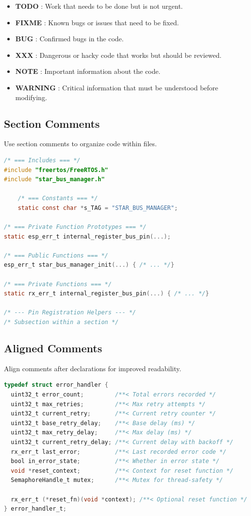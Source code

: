 \begin{itemize}
\item \textbf{TODO} : Work that needs to be done but is not urgent.
    \item \textbf{FIXME} : Known bugs or
    issues that need to be fixed.
    \item \textbf{BUG} : Confirmed bugs in the code.
    \item \textbf{XXX} : Dangerous or
    hacky code that works but should be
        reviewed.
    \item \textbf{NOTE} : Important information about the
                               code.
    \item \textbf{WARNING}
    : Critical information that must be understood before modifying.
\end{itemize}

\subsection{Section Comments}

Use section comments to organize code within files.

\begin{lstlisting}[language = C]
    /* === Includes === */
#include "freertos/FreeRTOS.h"
#include "star_bus_manager.h"

    /* === Constants === */
    static const char *s_TAG = "STAR_BUS_MANAGER";

/* === Private Function Prototypes === */
static esp_err_t internal_register_bus_pin(...);

/* === Public Functions === */
esp_err_t star_bus_manager_init(...) { /* ... */}

/* === Private Functions === */
static rx_err_t internal_register_bus_pin(...) { /* ... */}

/* --- Pin Registration Helpers --- */
/* Subsection within a section */
\end{lstlisting}

\subsection{Aligned Comments}

Align comments after declarations for improved readability.

\begin{lstlisting}[language=C]
typedef struct error_handler {
  uint32_t error_count;         /**< Total errors recorded */
  uint32_t max_retries;         /**< Max retry attempts */
  uint32_t current_retry;       /**< Current retry counter */
  uint32_t base_retry_delay;    /**< Base delay (ms) */
  uint32_t max_retry_delay;     /**< Max delay (ms) */
  uint32_t current_retry_delay; /**< Current delay with backoff */
  rx_err_t last_error;          /**< Last recorded error code */
  bool in_error_state;          /**< Whether in error state */
  void *reset_context;          /**< Context for reset function */
  SemaphoreHandle_t mutex;      /**< Mutex for thread-safety */

  rx_err_t (*reset_fn)(void *context); /**< Optional reset function */
} error_handler_t;
\end{lstlisting}


